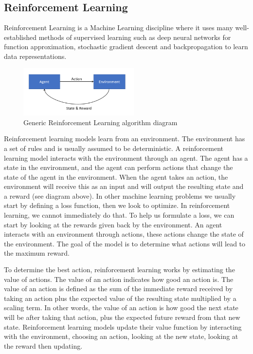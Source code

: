 \documentclass[conference]{IEEEtran}
\begin{document}
\subsection{Reinforcement Learning}
Reinforcement Learning is a Machine Learning discipline where it uses many well-established methods of supervised learning such as deep neural networks for function approximation, stochastic gradient descent and backpropagation to learn data representations.

\begin{figure}[htbp]
\centerline{\includegraphics[width=60mm]{images/rl_diag.png}}
\caption{Generic Reinforcement Learning algorithm diagram}
\label{fig5}
\end{figure}
Reinforcement learning models learn from an environment. The environment has a set of rules and is usually assumed to be deterministic. A reinforcement learning model interacts with the environment through an agent. The agent has a state in the environment, and the agent can perform actions that change the state of the agent in the environment.
When the agent takes an action, the environment will receive this as an input and will output the resulting state and a reward (see diagram above). In other machine learning problems we usually start by defining a loss function, then we look to optimize. In reinforcement learning, we cannot immediately do that. To help us formulate a loss, we can start by looking at the rewards given back by the environment.
An agent interacts with an environment through actions, these actions change the state of the environment. The goal of the model is to determine what actions will lead to the maximum reward.

To determine the best action, reinforcement learning works by estimating the value of actions. The value of an action indicates how good an action is.
The value of an action is defined as the sum of the immediate reward received by taking an action plus the expected value of the resulting state multiplied by a scaling term. In other words, the value of an action is how good the next state will be after taking that action, plus the expected future reward from that new state.
Reinforcement learning models update their value function by interacting with the environment, choosing an action, looking at the new state, looking at the reward then updating.
\end{document}
